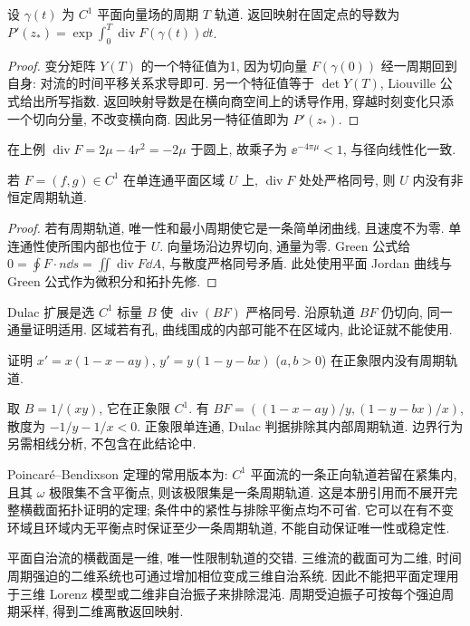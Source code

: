 \begin{proposition}[平面周期轨道的乘子]\label{prop:multiplier}
设 $\gamma(t)$ 为 $C^1$ 平面向量场的周期 $T$ 轨道. 返回映射在固定点的导数为
$P'(z_*)=\exp\int_0^T\operatorname{div}F(\gamma(t))\dd t$.
\end{proposition}
\begin{proof}
变分矩阵 $Y(T)$ 的一个特征值为1, 因为切向量 $F(\gamma(0))$ 经一周期回到自身: 对流的时间平移关系求导即可. 另一个特征值等于 $\det Y(T)$, Liouville 公式给出所写指数. 返回映射导数是在横向商空间上的诱导作用, 穿越时刻变化只添一个切向分量, 不改变横向商. 因此另一特征值即为 $P'(z_*)$.
\end{proof}
在上例 $\operatorname{div}F=2\mu-4r^2=-2\mu$ 于圆上, 故乘子为 $\ee^{-4\pi\mu}<1$, 与径向线性化一致.
\begin{theorem}[Bendixson 判据]
若 $F=(f,g)\in C^1$ 在单连通平面区域 $U$ 上, $\operatorname{div}F$ 处处严格同号, 则 $U$ 内没有非恒定周期轨道.
\end{theorem}
\begin{proof}
若有周期轨道, 唯一性和最小周期使它是一条简单闭曲线, 且速度不为零. 单连通性使所围内部也位于 $U$. 向量场沿边界切向, 通量为零. Green 公式给 $0=\oint F\cdot n\dd s=\iint\operatorname{div}F\dd A$, 与散度严格同号矛盾. 此处使用平面 Jordan 曲线与 Green 公式作为微积分和拓扑先修.
\end{proof}
Dulac 扩展是选 $C^1$ 标量 $B$ 使 $\operatorname{div}(BF)$ 严格同号. 沿原轨道 $BF$ 仍切向, 同一通量证明适用. 区域若有孔, 曲线围成的内部可能不在区域内, 此论证就不能使用.
\begin{example}证明 $x'=x(1-x-ay)$, $y'=y(1-y-bx)$ ($a,b>0$) 在正象限内没有周期轨道.\end{example}
\begin{solution}
取 $B=1/(xy)$, 它在正象限 $C^1$. 有 $BF=((1-x-ay)/y,(1-y-bx)/x)$, 散度为 $-1/y-1/x<0$. 正象限单连通, Dulac 判据排除其内部周期轨道. 边界行为另需相线分析, 不包含在此结论中.
\end{solution}
Poincar\'e--Bendixson 定理的常用版本为: $C^1$ 平面流的一条正向轨道若留在紧集内, 且其 $\omega$ 极限集不含平衡点, 则该极限集是一条周期轨道. 这是本册引用而不展开完整横截面拓扑证明的定理; 条件中的紧性与排除平衡点均不可省. 它可以在有不变环域且环域内无平衡点时保证至少一条周期轨道, 不能自动保证唯一性或稳定性.

平面自治流的横截面是一维, 唯一性限制轨道的交错. 三维流的截面可为二维, 时间周期强迫的二维系统也可通过增加相位变成三维自治系统. 因此不能把平面定理用于三维 Lorenz 模型或二维非自治振子来排除混沌. 周期受迫振子可按每个强迫周期采样, 得到二维离散返回映射.

